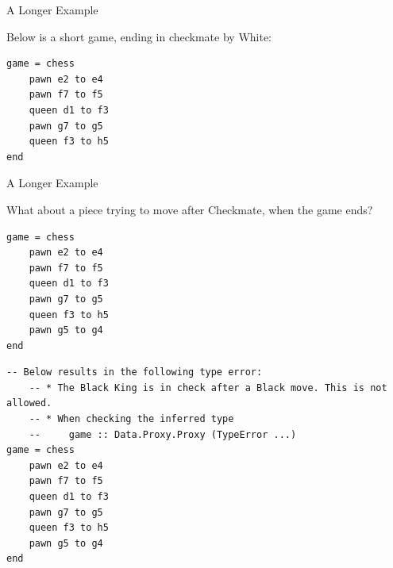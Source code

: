 \documentclass{beamer}
\begin{document}
\begin{frame}[fragile]{A Longer Example}

Below is a short game, ending in checkmate by White:

\begin{figure}[h]
    \centering
    \newgame
    \scalebox{0.55}{\showboard}
    \quad
    \scalebox{0.55}{\showboard}
    \label{threemovecheckmate}
\end{figure}

\pause

\begin{lstlisting}
game = chess
    pawn e2 to e4
    pawn f7 to f5
    queen d1 to f3
    pawn g7 to g5
    queen f3 to h5
end
\end{lstlisting}

\end{frame}

\begin{frame}[fragile]{A Longer Example}

What about a piece trying to move after Checkmate, when the game ends?

\begin{overprint}

\begin{lstlisting}
game = chess
    pawn e2 to e4
    pawn f7 to f5
    queen d1 to f3
    pawn g7 to g5
    queen f3 to h5
    pawn g5 to g4
end
\end{lstlisting}

\begin{lstlisting}
-- Below results in the following type error:
    -- * The Black King is in check after a Black move. This is not allowed.
    -- * When checking the inferred type
    --     game :: Data.Proxy.Proxy (TypeError ...)
game = chess
    pawn e2 to e4
    pawn f7 to f5
    queen d1 to f3
    pawn g7 to g5
    queen f3 to h5
    pawn g5 to g4
end
\end{lstlisting}

\end{overprint}

\end{frame}
\end{document}
